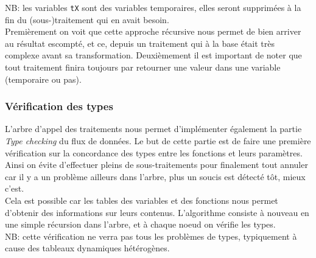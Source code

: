 \documentclass[french]{article}
\begin{document}
		NB: les variables \texttt{tX} sont des variables temporaires, elles seront supprimées à la fin du (sous-)traitement qui en avait besoin.\\
		
		Premièrement on voit que cette approche récursive nous permet de bien arriver au résultat escompté, et ce, depuis un traitement qui à la base était très complexe avant sa transformation. Deuxièmement il est important de noter que tout traitement finira toujours par retourner une valeur dans une variable (temporaire ou pas).
		
		\subsubsection{Vérification des types}
		\label{subsubsec:verification-des-types}
		L'arbre d'appel des traitements nous permet d'implémenter également la partie \textit{Type checking} du flux de données. Le but de cette partie est de faire une première vérification sur la concordance des types entre les fonctions et leurs paramètres. Ainsi on évite d'effectuer pleins de sous-traitements pour finalement tout annuler car il y a un problème ailleurs dans l'arbre, plus un soucis est détecté tôt, mieux c'est.\\
		
		Cela est possible car les tables des variables et des fonctions nous permet d'obtenir des informations sur leurs contenus. L'algorithme consiste à nouveau en une simple récursion dans l'arbre, et à chaque noeud on vérifie les types.\\
		
		NB: cette vérification ne verra pas tous les problèmes de types, typiquement à cause des tableaux dynamiques hétérogènes.
		
		
		\listoffigures
		
\end{document}
